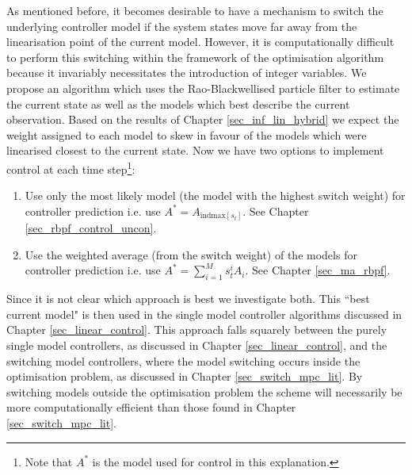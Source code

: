 As mentioned before, it becomes desirable to have a mechanism to switch the underlying controller model if the system states move far away from the linearisation point of the current model. However, it is computationally difficult to perform this switching within the framework of the optimisation algorithm because it invariably necessitates the introduction of integer variables. We propose an algorithm which uses the Rao-Blackwellised particle filter to estimate the current state as well as the models which best describe the current observation. Based on the results of Chapter \ref{sec_inf_lin_hybrid} we expect the weight assigned to each model to skew in favour of the models which were linearised closest to the current state. Now we have two options to implement control at each time step\footnote{Note that $A^*$ is the model used for control in this explanation.}:
\begin{enumerate}
\item
Use only the most likely model (the model with the highest switch weight) for controller prediction i.e. use $A^* = A_{\text{indmax}[s_t]}$. See Chapter \ref{sec_rbpf_control_uncon}.
\item
Use the weighted average (from the switch weight) of the models for controller prediction i.e. use $A^* = \sum_{i=1}^M s_t^i A_i$. See Chapter \ref{sec_ma_rbpf}.
\end{enumerate}
Since it is not clear which approach is best we investigate both. This ``best current model" is then used in the single model controller algorithms discussed in Chapter \ref{sec_linear_control}. This approach falls squarely between the purely single model controllers, as discussed in Chapter \ref{sec_linear_control}, and the switching model controllers, where the model switching occurs inside the optimisation problem, as discussed in Chapter \ref{sec_switch_mpc_lit}. By switching models outside the optimisation problem the scheme will necessarily be more computationally efficient than those found in Chapter \ref{sec_switch_mpc_lit}. 

